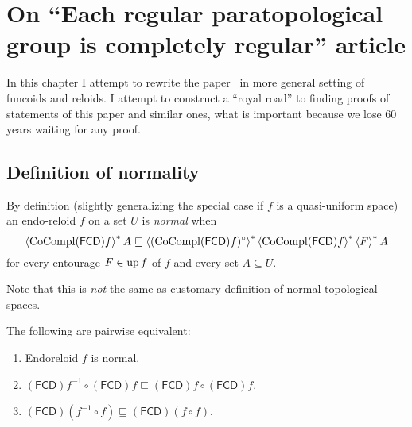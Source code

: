 \chapter{On ``Each regular paratopological group is completely regular'' article}

In this chapter I attempt to rewrite the paper~\cite{2014arXiv1410.1504B} in more general setting of funcoids and reloids.
I attempt to construct a ``royal road'' to finding proofs of statements of this paper and similar ones, what is
important because we lose 60 years waiting for any proof.

\section{Definition of normality}


By definition (slightly generalizing the special case if $f$ is a
quasi-uniform space) an endo-reloid $f$ on a set $U$ is \emph{normal} when
\[ \left\langle \operatorname{CoCompl} (\mathsf{FCD}) f\right\rangle ^{\ast} A \sqsubseteq \left\langle 
(\operatorname{CoCompl} (\mathsf{FCD}) f)^{\circ}\right\rangle ^{\ast} \left\langle \operatorname{CoCompl} (\mathsf{FCD})
f \right\rangle ^{\ast} \left\langle F\right\rangle ^{\ast} A \] for every entourage $F \in
\operatorname{up} f$ of $f$ and every set $A \subseteq U$.

Note that this is \emph{not} the same as customary definition of normal topological spaces.

\begin{thm}
  The following are pairwise equivalent:
  \begin{enumerate}
    \item Endoreloid $f$ is normal.
    
    \item $(\mathsf{FCD}) f^{- 1} \circ (\mathsf{FCD}) f
    \sqsubseteq (\mathsf{FCD}) f \circ (\mathsf{FCD}) f$.
    
    \item $(\mathsf{FCD}) (f^{- 1} \circ f) \sqsubseteq
    (\mathsf{FCD}) (f \circ f)$.
  \end{enumerate}
\end{thm}

